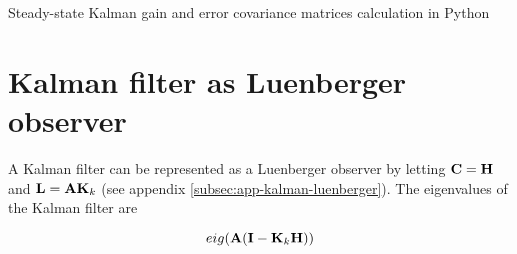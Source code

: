 \begin{snippet}
  \caption{Steady-state Kalman gain and error covariance matrices calculation in Python}
  \label{lst:kalman}
\end{snippet}

\section{Kalman filter as Luenberger observer}

A Kalman filter can be represented as a Luenberger observer by letting
$\mathbf{C} = \mathbf{H}$ and $\mathbf{L} = \mathbf{A} \mathbf{K}_k$ (see appendix
\ref{subsec:app-kalman-luenberger}). The eigenvalues of the Kalman filter are

\begin{equation}
  eig(\mathbf{A}(\mathbf{I} - \mathbf{K}_k\mathbf{H}))
\end{equation}
